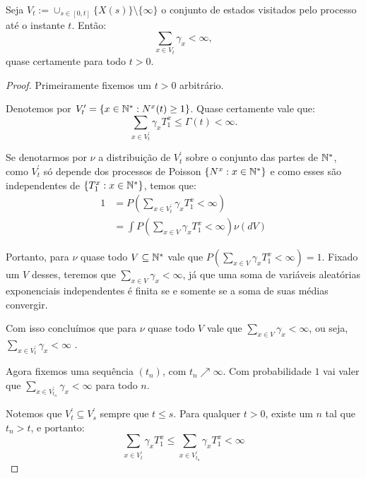 \begin{proposicao}
  \label{prop:gamma-somavel}
  Seja $V_t := \cup_{s \in [0, t]} \{ X(s) \} \setminus \{\infty\}$ o
  conjunto de estados visitados pelo processo até o instante
  $t$. Então:
  \begin{displaymath}
    \sum_{x \in V_t} \gamma_x < \infty,
  \end{displaymath}
  quase certamente para todo $t > 0$.
\end{proposicao}
\begin{proof}

  Primeiramente fixemos um $t > 0$ arbitrário.

  Denotemos por $V^\prime_t = \{ x \in {\mathbb{N^*}}: N^x(t) \geq 1 \}$. Quase
  certamente vale que:
  \begin{displaymath}
    \sum_{x \in V^\prime_t} \gamma_x T^x_1 \leq \Gamma(t) < \infty.
  \end{displaymath}

  Se denotarmos por $\nu$ a distribuição de $V^\prime_t$ sobre o
  conjunto das partes de ${\mathbb{N^*}}$, como $V^\prime_t$ só depende dos
  processos de Poisson $\{N^x: x \in {\mathbb{N^*}}\}$ e como esses são
  independentes de $\{ T^x_1: x \in {\mathbb{N^*}} \}$, temos que:
  \begin{align*}
    1 &= P\left(\sum_{x \in V^\prime_t} \gamma_x T^x_1 < \infty
    \right)\\
    &=\int P\left(\sum_{x \in V} \gamma_x T^x_1 < \infty
    \right) \nu(dV)
  \end{align*}

  Portanto, para $\nu$ quase todo $V \subseteq {\mathbb{N^*}}$ vale que
  $P(\sum_{x \in V} \gamma_x T^x_1 < \infty) = 1$. Fixado um
  $V$ desses, teremos que $\sum_{x \in V}\gamma_x < \infty$, já que
  uma soma de variáveis aleatórias exponenciais independentes é finita
  \qc se e somente se a soma de suas médias convergir.

  Com isso concluímos que para $\nu$ quase todo $V$ vale que $\sum_{x
    \in V}\gamma_x < \infty$, ou seja, $\sum_{x \in
    V^\prime_t}\gamma_x < \infty$ \qc.

  Agora fixemos uma sequência $(t_n)$, com $t_n\nearrow
  \infty$. Com probabilidade $1$ vai valer que $\sum_{x \in
    V^\prime_{t_n}}\gamma_x < \infty$ para todo $n$.

  Notemos que $V^\prime_t \subseteq V^\prime_s$ sempre que $t \leq
  s$. Para qualquer $t > 0$, existe um $n$ tal que $t_n > t$, e
  portanto:
  \begin{displaymath}
    \sum_{x \in V^\prime_t}\gamma_x T^x_1 \leq
    \sum_{x \in V^\prime_{t_n}}\gamma_x T^x_1 < \infty
  \end{displaymath}


\end{proof}

